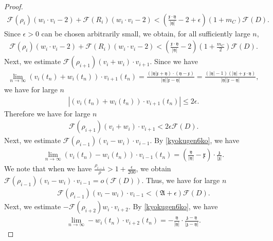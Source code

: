 \documentclass[10pt,a4paper]{amsart}
\numberwithin{equation}{section}
\begin{document}
\begin{proof}
\begin{align*}
\mathcal{F}(\rho_i)(w_i\cdot v_i-2)+\mathcal{F}(R_i)(w_i\cdot v_i-2)<\left(\frac{\mathfrak{x}\cdot \mathfrak{y}}{|\mathfrak{y}|}-2+\epsilon\right)(1+m_C)\mathcal{F}(D).
\end{align*}
Since $\epsilon>0$ can be chosen arbitrarily small, we obtain, for all sufficiently large $n$,
\begin{align}\label{rhoiRies}
\mathcal{F}(\rho_i)(w_i\cdot v_i-2)+\mathcal{F}(R_i)(w_i\cdot v_i-2)<\left(\frac{\mathfrak{x}\cdot\mathfrak{y}}
{|\mathfrak{y}|}-2\right)\left(1+\frac{m_C}{2}\right)
\mathcal{F}(D).
\end{align}
Next, we estimate $\mathcal{F}(\rho_{i+1})(v_i+w_i)\cdot v_{i+1}$. Since we have
\begin{align*}
\lim_{n\to\infty} (v_i(t_n)+w_i(t_n))\cdot v_{i+1}(t_n)=\frac{\left(|\mathfrak{y}|\mathfrak{x}+\mathfrak{y}\right)\cdot \left(\mathfrak{y}-\mathfrak{x}\right)}{|\mathfrak{y}||\mathfrak{x}-\mathfrak{y}|}=\frac{\left(|\mathfrak{y}|-1\right)\left(|\mathfrak{y}|+\mathfrak{x}\cdot \mathfrak{y}\right)}{|\mathfrak{y}||\mathfrak{x}-\mathfrak{y}|},
\end{align*}
we have for large $n$
\begin{align*}
\left|(v_i(t_n)+w_i(t_n))\cdot v_{i+1}(t_n)\right|\leq 2\epsilon.
\end{align*}
Therefore we have for large $n$
\begin{align}\label{rhoi+1es}
\mathcal{F}(\rho_{i+1})(v_i+w_i)\cdot v_{i+1}<2\epsilon\mathcal{F}(D).
\end{align}
Next, we estimate $\mathcal{F}(\rho_{i-1})(v_i-w_i)\cdot v_{i-1}$. By \eqref{kyokugen6ko}, we have
\begin{align*}
\lim_{n\to\infty}(v_i(t_n)-w_i(t_n))\cdot v_{i-1}(t_n)=\left(\frac{\mathfrak{y}}{|\mathfrak{y}|}-\mathfrak{x}\right)\cdot \frac{\mathfrak{z}}{|\mathfrak{z}|}.
\end{align*}
We note that when we have $\frac{\rho_{i-1}}{\rho}>1+\frac{\epsilon}{200}$, we obtain $\mathcal{F}(\rho_{i-1})(v_i-w_i)\cdot v_{i-1}=o\left(\mathcal{F}(D)\right)$. Thus, we have for large $n$
\begin{align}\label{rhoi-1es}
\mathcal{F}(\rho_{i-1})(v_i-w_i)\cdot v_{i-1}< \left(\mathfrak{A}+\epsilon\right)\mathcal{F}(D).
\end{align}
Next, we estimate $ -\mathcal{F}(\rho_{i+2})w_i\cdot v_{i+2}$. By \eqref{kyokugen6ko}, we have
\begin{align*}
\lim_{n\to\infty}-w_i(t_n)\cdot v_{i+2}(t_n)=-\frac{\mathfrak{y}}{|\mathfrak{y}|}\cdot \frac{\mathfrak{z}-\mathfrak{y}}{|\mathfrak{z}-\mathfrak{y}|}.

\end{align*}
\end{proof}
\end{document}
